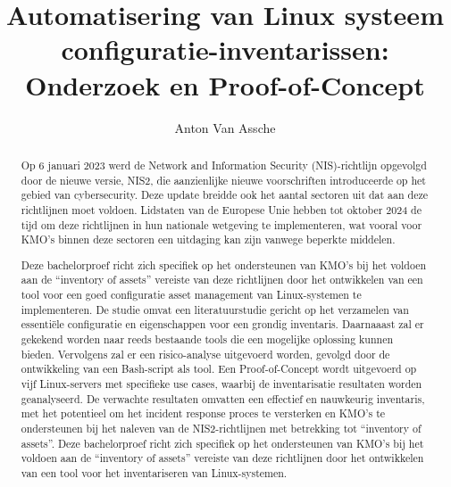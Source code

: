\documentclass{hogent-article}
\title{Automatisering van Linux systeem configuratie-inventarissen: Onderzoek en Proof-of-Concept}
\author{Anton Van Assche}
\begin{document}
\begin{abstract}
    Op 6 januari 2023 werd de Network and Information Security (NIS)-richtlijn opgevolgd door de nieuwe versie, NIS2, die aanzienlijke nieuwe voorschriften introduceerde op het gebied van cybersecurity.
    Deze update breidde ook het aantal sectoren uit dat aan deze richtlijnen moet voldoen.
    Lidstaten van de Europese Unie hebben tot oktober 2024 de tijd om deze richtlijnen in hun nationale wetgeving te implementeren, wat vooral voor KMO's binnen deze sectoren een uitdaging kan zijn vanwege beperkte middelen.
    \newline

    Deze bachelorproef richt zich specifiek op het ondersteunen van KMO's bij het voldoen aan de ``inventory of assets'' vereiste van deze richtlijnen door het ontwikkelen van een tool voor een goed configuratie asset management van Linux-systemen te implementeren.
    De studie omvat een literatuurstudie gericht op het verzamelen van essenti\"ele configuratie en eigenschappen voor een grondig inventaris. Daarnaaast zal er gekekend worden naar reeds bestaande tools die een mogelijke oplossing kunnen bieden.
    Vervolgens zal er een risico-analyse uitgevoerd worden, gevolgd door de ontwikkeling van een Bash-script als tool.
    Een Proof-of-Concept wordt uitgevoerd op vijf Linux-servers met specifieke use cases, waarbij de inventarisatie resultaten worden geanalyseerd.
    De verwachte resultaten omvatten een effectief en nauwkeurig inventaris, met het potentieel om het incident response proces te versterken en KMO's te ondersteunen bij het naleven van de NIS2-richtlijnen met betrekking tot ``inventory of assets''.
    Deze bachelorproef richt zich specifiek op het ondersteunen van KMO's bij het voldoen aan de ``inventory of assets'' vereiste van deze richtlijnen door het ontwikkelen van een tool voor het inventariseren van Linux-systemen.
\end{abstract}

\tableofcontents



\printbibliography[heading=bibintoc]
\end{document}
